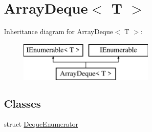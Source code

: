 \hypertarget{classOTA_1_1Misc_1_1ArrayDeque}{}\section{Array\+Deque$<$ T $>$}
\label{classOTA_1_1Misc_1_1ArrayDeque}
Inheritance diagram for Array\+Deque$<$ T $>$\+:\begin{figure}[H]
\begin{center}
\leavevmode
\includegraphics[height=2.000000cm]{classOTA_1_1Misc_1_1ArrayDeque}
\end{center}
\end{figure}
\subsection*{Classes}
\begin{DoxyCompactItemize}
\item 
struct \hyperlink{structOTA_1_1Misc_1_1ArrayDeque_1_1DequeEnumerator}{Deque\+Enumerator}
\end{DoxyCompactItemize}
